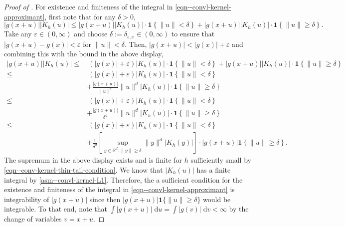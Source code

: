 \begin{proof}[Proof of ]
For existence and finiteness of the integral in
\eqref{eqn--convl-kernel-approximant}, first note that for any \(\delta > 0\),
\begin{equation*}
  |g (x + u)| \left| K_{h} (u) \right| \leq |g (x + u)| \left| K_{h} (u) \right|
  \cdot \mathbf{1} \left\{ \|u\| < \delta \right\} + |g (x + u)| \left| K_{h}
  (u) \right| \cdot \mathbf{1} \left\{ \|u\| \geq \delta \right\}.
\end{equation*}
Take any \(\varepsilon \in (0, \infty)\) and choose \(\delta :=
\delta_{\varepsilon, x} \in (0, \infty)\) to ensure that \(|g (x + u) - g (x)| <
\varepsilon\) for \(\|u\| < \delta\).
Then, \(|g (x + u)| < |g (x)| + \varepsilon\) and combining this with the bound
in the above display,
\begin{align*}
  |g (x + u)| \left| K_{h} (u) \right| \leq
  & \ (|g (x)| + \varepsilon) \left| K_{h} (u) \right|
  \cdot \mathbf{1} \left\{ \|u\| < \delta \right\} + |g (x + u)| \left| K_{h}
  (u) \right| \cdot \mathbf{1} \left\{ \|u\| \geq \delta \right\} \\
  \leq
  & \ (|g (x)| + \varepsilon) \left| K_{h} (u) \right| \cdot \mathbf{1} \left\{
  \|u\| < \delta \right\} \\
  & + \frac{|g (x + u)|}{\|u\|^{d}} \|u\|^{d} \left| K_{h} (u) \right| \cdot
  \mathbf{1} \left\{ \|u\| \geq \delta \right\} \\
  \leq
  & \ (|g (x)| + \varepsilon) \left| K_{h} (u) \right| \cdot \mathbf{1} \left\{
  \|u\| < \delta \right\} \\
  & + \frac{|g (x + u)|}{\delta^{d}} \|u\|^{d} \left| K_{h} (u) \right| \cdot
  \mathbf{1} \left\{ \|u\| \geq \delta \right\} \\
  \leq
  & \ (|g (x)| + \varepsilon) \left| K_{h} (u) \right| \cdot \mathbf{1} \left\{
  \|u\| < \delta \right\} \\
  & + \frac{1}{\delta^{d}} \left[ \sup_{y \in \mathbb{R}^{d} : \|y\| \geq
  \delta} \|y\|^{d} \left| K_{h} (y) \right| \right] \cdot |g (x + u)|
  \mathbf{1} \left\{ \|u\| \geq \delta \right\}.
\end{align*}
The supremum in the above display exists and is finite for \(h\) sufficiently
small by \eqref{eqn--conv-kernel-thin-tail-condition}.
We know that \(\left| K_{h} (u) \right|\) has a finite integral by
 \ref{asm--convl-kernel-L1}.
Therefore, the a sufficient condition for the existence and finiteness of the
integral in \eqref{eqn--convl-kernel-approximant} is integrability of \(|g (x +
u)|\) since then \(|g (x + u)| \mathbf{1} \{\|u\| \geq \delta\}\) would be
integrable.
To that end, note that \(\int |g (x + u)| \; \mathrm{d} u = \int |g (v)| \;
\mathrm{d} v < \infty\) by the change of variables \(v = x + u\).


\end{proof}

